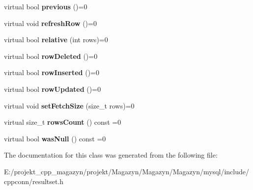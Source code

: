 \begin{DoxyCompactItemize}
\item 
\hypertarget{classsql_1_1_result_set_ab921268bb09bf9d557570f910e9741de}{}\label{classsql_1_1_result_set_ab921268bb09bf9d557570f910e9741de} 
virtual bool {\bfseries previous} ()=0
\item 
\hypertarget{classsql_1_1_result_set_a9466db8907508e209f82a9847886a878}{}\label{classsql_1_1_result_set_a9466db8907508e209f82a9847886a878} 
virtual void {\bfseries refresh\+Row} ()=0
\item 
\hypertarget{classsql_1_1_result_set_a36a28b2af0f0531bcc323e8e839ec39e}{}\label{classsql_1_1_result_set_a36a28b2af0f0531bcc323e8e839ec39e} 
virtual bool {\bfseries relative} (int rows)=0
\item 
\hypertarget{classsql_1_1_result_set_a1d394a1de962d0f3ea4b33124e71b59a}{}\label{classsql_1_1_result_set_a1d394a1de962d0f3ea4b33124e71b59a} 
virtual bool {\bfseries row\+Deleted} ()=0
\item 
\hypertarget{classsql_1_1_result_set_a1de60fd68d2726575cae585c5fd2082a}{}\label{classsql_1_1_result_set_a1de60fd68d2726575cae585c5fd2082a} 
virtual bool {\bfseries row\+Inserted} ()=0
\item 
\hypertarget{classsql_1_1_result_set_a403242024da35acd8948ecb355351b1c}{}\label{classsql_1_1_result_set_a403242024da35acd8948ecb355351b1c} 
virtual bool {\bfseries row\+Updated} ()=0
\item 
\hypertarget{classsql_1_1_result_set_a55fc3a825e0b89bc10556007c82493e2}{}\label{classsql_1_1_result_set_a55fc3a825e0b89bc10556007c82493e2} 
virtual void {\bfseries set\+Fetch\+Size} (size\+\_\+t rows)=0
\item 
\hypertarget{classsql_1_1_result_set_a86075ae907d7e21948abd552358edbc3}{}\label{classsql_1_1_result_set_a86075ae907d7e21948abd552358edbc3} 
virtual size\+\_\+t {\bfseries rows\+Count} () const =0
\item 
\hypertarget{classsql_1_1_result_set_ad16ebfbca7d204c653b6a31208d44ba9}{}\label{classsql_1_1_result_set_ad16ebfbca7d204c653b6a31208d44ba9} 
virtual bool {\bfseries was\+Null} () const =0
\end{DoxyCompactItemize}


The documentation for this class was generated from the following file\+:\begin{DoxyCompactItemize}
\item 
E\+:/projekt\+\_\+cpp\+\_\+magazyn/projekt/\+Magazyn/\+Magazyn/\+Magazyn/mysql/include/cppconn/resultset.\+h\end{DoxyCompactItemize}
